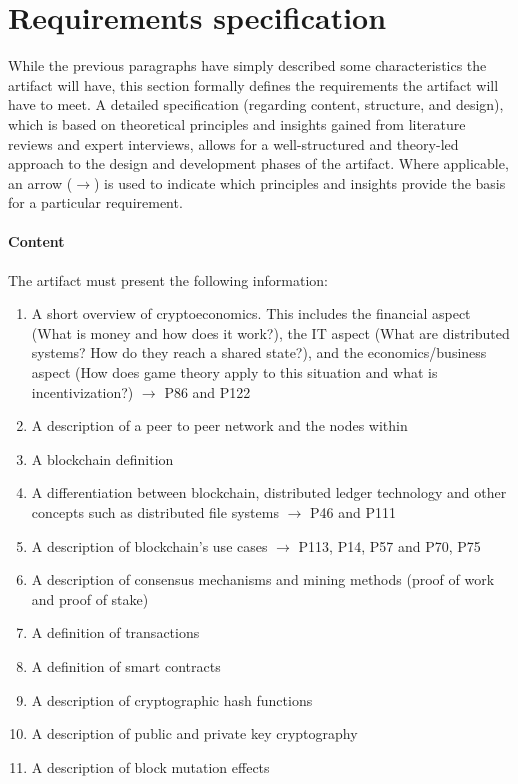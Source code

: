 \section{Requirements specification} \label{sec:ReqSpec}
While the previous paragraphs have simply described some characteristics the artifact will have, this section formally defines the requirements the artifact will have to meet. A detailed specification (regarding content, structure, and design), which is based on theoretical principles and insights gained from literature reviews and expert interviews, allows for a well-structured and theory-led approach to the design and development phases of the artifact. Where applicable, an arrow ($\rightarrow$) is used to indicate which principles and insights provide the basis for a particular requirement.

\paragraph{Content} The artifact must present the following information: 
\begin{enumerate}[nosep]
    \item A short overview of cryptoeconomics. This includes the financial aspect (What is money and how does it work?), the IT aspect (What are distributed systems? How do they reach a shared state?), and the economics/business aspect (How does game theory apply to this situation and what is incentivization?) $\rightarrow$ \cite{RalphBeckmann_Interview} P86 and P122
    \item A description of a peer to peer network and the nodes within
    \item A blockchain definition 
    \item A differentiation between blockchain, distributed ledger technology and other concepts such as distributed file systems $\rightarrow$ \cite{DanielKaltenbach_Interview} P46 and \cite{RalphBeckmann_Interview} P111
    \item A description of blockchain's use cases $\rightarrow$ \cite{RalphBeckmann_Interview} P113, \cite{DanielKaltenbach_Interview} P14, P57 and \cite{BjoernPaulewicz_Interview} P70, P75
    \item A description of consensus mechanisms and mining methods (proof of work and proof of stake)
    \item A definition of transactions
    \item A definition of smart contracts
    \item A description of cryptographic hash functions
    \item A description of public and private key cryptography
    \item A description of block mutation effects
\setcounter{foo}{\value{enumi}}
\end{enumerate}


